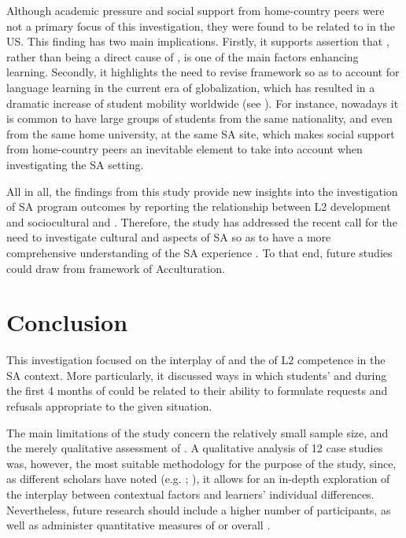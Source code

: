 \documentclass[output=paper]{langsci/langscibook}
\begin{document}
Although academic pressure and social support from home-country peers were not a primary focus of this investigation, they were found to be related to  in the US. This finding has two main implications. Firstly, it supports  assertion that , rather than being a direct cause of  , is one of the main factors enhancing  learning. Secondly, it highlights the need to revise  framework so as to account for language learning in the current era of globalization, which has resulted in a dramatic increase of student mobility worldwide (see \citealt{MitchellEtAl2015,MitchellEtAl2017}). For instance, nowadays it is common to have large groups of students from the same nationality, and even from the same home university, at the same SA site, which makes social support from home-country peers an inevitable element to take into account when investigating the SA setting. 

All in all, the findings from this study provide new insights into the investigation of SA program outcomes by reporting the relationship between L2  development and sociocultural and . Therefore, the study has addressed the recent call for the need to investigate cultural and  aspects of SA so as to have a more comprehensive understanding of the SA experience \citep{Taguchi2015crosscultural}. To that end, future studies could draw from  framework of Acculturation.


\section{Conclusion}

This investigation focused on the interplay of  and the  of L2  competence in the SA context. More particularly, it discussed ways in which students’  and  during the first 4 months of  could be related to their ability to formulate requests and refusals appropriate to the given situation.

  
The main limitations of the study concern the relatively small sample size, and the merely qualitative assessment of . A qualitative analysis of 12 case studies was, however, the most suitable methodology for the purpose of the study, since, as different scholars have noted (e.g. \citealt{DörnyeiEtAl2004}; \citealt{Taguchi2011}), it allows for an in-depth exploration of the interplay between contextual factors and learners’ individual differences. Nevertheless, future research should include a higher number of participants, as well as administer quantitative measures of  or overall .
\end{document}
